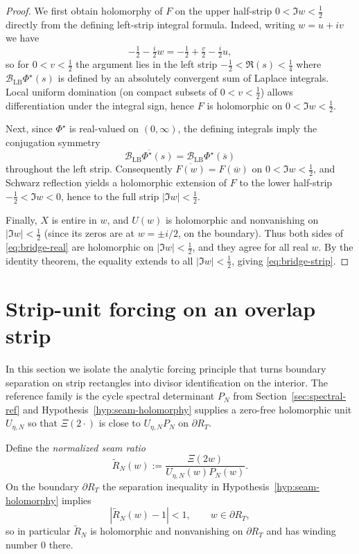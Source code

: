 \documentclass[11pt]{amsart}
\theoremstyle{definition}
\theoremstyle{remark}
\begin{document}
\begin{proof}
We first obtain holomorphy of $F$ on the upper half-strip $0<\Im w<\tfrac12$ directly from the
defining left-strip integral formula. Indeed, writing $w=u+iv$ we have
\[
-\tfrac12-\tfrac{i}{2}w=-\tfrac12+\tfrac{v}{2}-\tfrac{i}{2}u,
\]
so for $0<v<\tfrac12$ the argument lies in the left strip $-\tfrac12<\Re(s)<\tfrac14$ where
$\mathcal B_{\mathrm{LB}}\Phi^\star(s)$ is defined by an absolutely convergent sum of Laplace integrals.
Local uniform domination (on compact subsets of $0<v<\tfrac12$) allows differentiation under the
integral sign, hence $F$ is holomorphic on $0<\Im w<\tfrac12$.

Next, since $\Phi^\star$ is real-valued on $(0,\infty)$, the defining integrals imply the conjugation
symmetry
\[
\overline{\mathcal B_{\mathrm{LB}}\Phi^\star(s)}=\mathcal B_{\mathrm{LB}}\Phi^\star(\overline{s})
\]
throughout the left strip. Consequently $\overline{F(w)}=F(\overline{w})$ on $0<\Im w<\tfrac12$, and
Schwarz reflection yields a holomorphic extension of $F$ to the lower half-strip $-\tfrac12<\Im w<0$,
hence to the full strip $|\Im w|<\tfrac12$.

Finally, $X$ is entire in $w$, and $U(w)$ is holomorphic and nonvanishing on $|\Im w|<\tfrac12$
(since its zeros are at $w=\pm i/2$, on the boundary). Thus both sides of \eqref{eq:bridge-real} are
holomorphic on $|\Im w|<\tfrac12$, and they agree for all real $w$. By the identity theorem, the
equality extends to all $|\Im w|<\tfrac12$, giving \eqref{eq:bridge-strip}.
\end{proof}


\section{Strip-unit forcing on an overlap strip}\label{sec:completion-ledger}
In this section we isolate the analytic forcing principle that turns boundary separation on strip
rectangles into divisor identification on the interior.  The reference family is the cycle spectral
determinant $P_N$ from Section~\ref{sec:spectral-ref} and Hypothesis~\ref{hyp:seam-holomorphy} supplies
a zero-free holomorphic unit $U_{\eta,N}$ so that $\Xi(2\cdot)$ is close to $U_{\eta,N}P_N$ on
$\partial R_T$.

Define the \emph{normalized seam ratio}
\[
\widetilde R_{N}(w):=\frac{\Xi(2w)}{U_{\eta,N}(w)P_N(w)}.
\]
On the boundary $\partial R_T$ the separation inequality in Hypothesis~\ref{hyp:seam-holomorphy} implies
\[
|\widetilde R_N(w)-1|<1,\qquad w\in\partial R_T,
\]
so in particular $\widetilde R_N$ is holomorphic and nonvanishing on $\partial R_T$ and has winding
number $0$ there.
\end{document}
